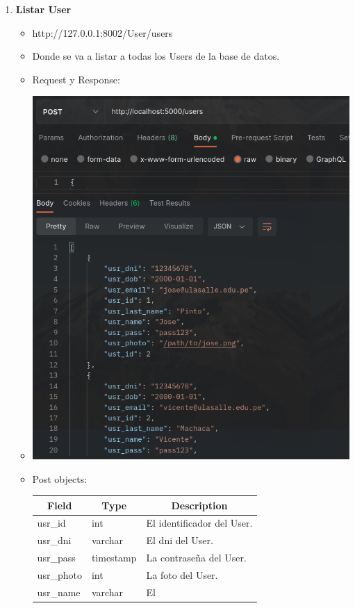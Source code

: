 \documentclass{article}
\begin{document}
\begin{enumerate}
    \item \textbf{Listar User}
    \begin{itemize}
        \item http://127.0.0.1:8002/User/users
        \item Donde se va a listar a todas los Users de la base de datos.
        \item Request y Response:
        \item \includegraphics[scale=.5]{assets/user/users.png}
        \item Post objects: \begin{table}[H] \centering \begin{tabular}{|l|l|l|}
        \hline \multicolumn{1}{|c|}{\textbf{Field}} &
        \multicolumn{1}{c|}{\textbf{Type}} &
        \multicolumn{1}{c|}{\textbf{Description}} \\ \hline usr\_id & int & El
        identificador del User. \\ \hline usr\_dni & varchar & El dni del User.
        \\ \hline usr\_pass & timestamp & La contraseña del User. \\ \hline
        usr\_photo & int & La foto del User. \\ \hline usr\_name & varchar & El

\end{tabular}
\end{table}
\end{itemize}
\end{enumerate}
\end{document}
